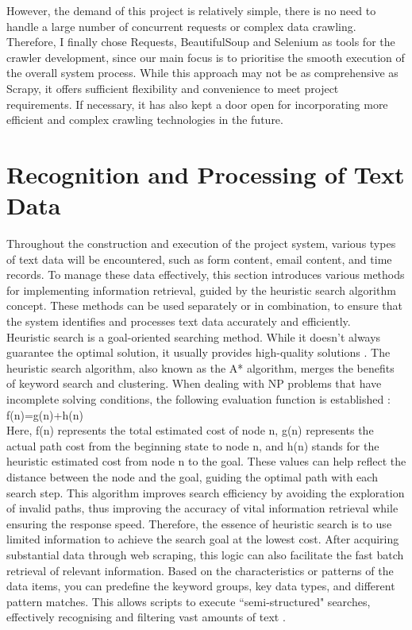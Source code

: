\documentclass[ oneside,%
                    author={Cassie Qing Tang},
                    degree={BSc},
                     title={An Automated Response System for Disrupting Online Pet Scamming \\ },
                    subtitle={ }]{dissertation}
\begin{document}
However, the demand of this project is relatively simple, there is no need to handle a large number of concurrent requests or complex data crawling. Therefore, I finally chose Requests, BeautifulSoup and Selenium as tools for the crawler development, since our main focus is to prioritise the smooth execution of the overall system process. While this approach may not be as comprehensive as Scrapy, it offers sufficient flexibility and convenience to meet project requirements. If necessary, it has also kept a door open for incorporating more efficient and complex crawling technologies in the future.


\section{Recognition and Processing of Text Data}
Throughout the construction and execution of the project system, various types of text data will be encountered, such as form content, email content, and time records. To manage these data effectively, this section introduces various methods for implementing information retrieval, guided by the heuristic search algorithm concept. These methods can be used separately or in combination, to ensure that the system identifies and processes text data accurately and efficiently.
\\

Heuristic search is a goal-oriented searching method. While it doesn't always guarantee the optimal solution, it usually provides high-quality solutions \cite{a_chapter_2001}. The heuristic search algorithm, also known as the A* algorithm, merges the benefits of keyword search and clustering. When dealing with NP problems that have incomplete solving conditions, the following evaluation function is established \cite{zhao_information_2014}:
\\

f(n)=g(n)+h(n)
\\

Here, f(n) represents the total estimated cost of node n, g(n) represents the actual path cost from the beginning state to node n, and h(n) stands for the heuristic estimated cost from node n to the goal. These values can help reflect the distance between the node and the goal, guiding the optimal path with each search step. This algorithm improves search efficiency by avoiding the exploration of invalid paths, thus improving the accuracy of vital information retrieval while ensuring the response speed. Therefore, the essence of heuristic search is to use limited information to achieve the search goal at the lowest cost. After acquiring substantial data through web scraping, this logic can also facilitate the fast batch retrieval of relevant information. Based on the characteristics or patterns of the data items, you can predefine the keyword groups, key data types, and different pattern matches. This allows scripts to execute ``semi-structured" searches, effectively recognising and filtering vast amounts of text \cite{manning_introduction_2009}.
\\
\end{document}
